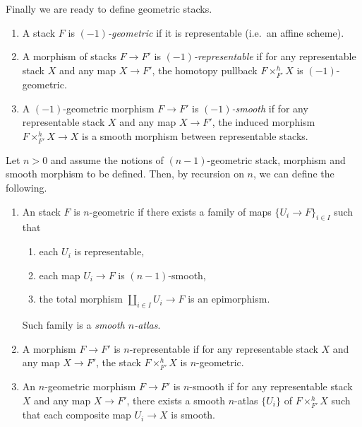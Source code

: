         Finally we are ready to define geometric stacks.
        \begin{defn}\hfill
            \label{defn:algebraic_stack_classic}
            \begin{enumerate}
                \item A stack $F$ is \emph{$(-1)$-geometric} if it is representable (i.e.\ an affine scheme).
                \item A morphism of stacks $F \to F'$ is \emph{$(-1)$-representable} if for any representable stack $X$ and any map $X \to F'$, the homotopy pullback $F \times^h_{F'} X$ is $(-1)$-geometric.
                \item A $(-1)$-geometric morphism $F \to F'$ is \emph{$(-1)$-smooth} if for any representable stack $X$ and any map $X \to F'$, the induced morphism $F \times^h_{F'} X \to X$ is a smooth morphism between representable stacks.
            \end{enumerate}
            Let $n > 0$ and assume the notions of $(n-1)$-geometric stack, morphism and smooth morphism to be defined. Then, by recursion on $n$, we can define the following.
            \begin{enumerate}
                \item An stack $F$ is $n$-geometric if there exists a family of maps $\{U_i \to F\}_{i \in I}$ such that 
                \begin{enumerate}[label=(\alph*)]
                    \item each $U_i$ is representable,
                    \item each map $U_i \to F$ is $(n-1)$-smooth,
                    \item the total morphism $\coprod_{i \in I} U_i \to F$ is an epimorphism.
                \end{enumerate}
                Such family is a \emph{smooth $n$-atlas}.
                \item A morphism $F \to F'$ is $n$-representable if for any representable stack $X$ and any map $X \to F'$, the stack $F \times^h_{F'} X$ is $n$-geometric.
                \item An $n$-geometric morphism $F \to F'$ is $n$-smooth if for any representable stack $X$ and any map $X \to F'$, there exists a smooth $n$-atlas $\{U_i\}$ of $F \times^h_{F'} X$ such that each composite map $U_i \to X$ is smooth.
            \end{enumerate}
        \end{defn}
